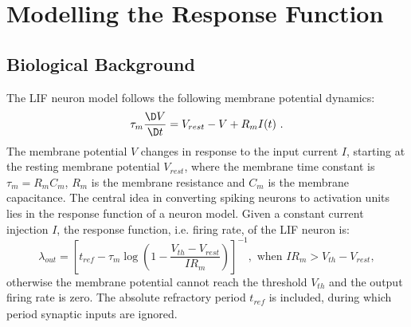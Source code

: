 	
	
\DIFaddend \section{Modelling the \DIFaddbegin {}\DIFaddend Response Function}
	\label{sec:response_func}
	\DIFaddbegin {}

	
	
	\DIFaddend \subsection{Biological Background}
	\label{sec:siergert}
	The LIF neuron model follows the following membrane potential dynamics:
	\begin{equation}
	\tau_m \frac{\D V}{\D t}=V_{rest} - V + R_{m} I(t) ~.
	\label{equ:LIF_V}
	\end{equation}
	The membrane potential $V$ changes in response to the input current $I$, starting at the resting membrane potential $V_{rest}$, where the membrane time constant is $\tau_m = R_mC_m$, $R_m$ is the membrane resistance and $C_m$ is the membrane capacitance.
	The central idea in converting spiking neurons to activation units lies in the response function of a neuron model.
	Given a constant current injection $I$, the response function, i.e. firing rate, of the LIF neuron is:
	\begin{equation}
	\lambda_\mathit{out}=
	\left [ t_\mathit{ref}-\tau_m\log \left ( 1-\frac{V_{th}-V_\mathit{rest}}{IR_m}  \right )\right ]^{-1}, \textrm{~when~} IR_m>V_{th}-V_{rest},
	\label{equ:consI}
	\end{equation}
	otherwise the membrane potential cannot reach the threshold $V_{th}$ and the output firing rate is zero. 
	The absolute refractory period $t_\mathit{ref}$ is included, during which period synaptic inputs are ignored.

